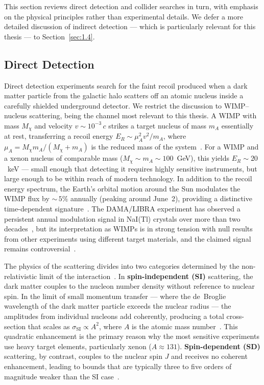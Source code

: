 This section reviews direct detection and collider searches in turn, with emphasis on the physical principles rather than experimental details.
We defer a more detailed discussion of indirect detection --- which is particularly relevant for this thesis --- to Section~\ref{sec:1.4}.

\subsection{Direct Detection}
\label{sec:1.3.1}

Direct detection experiments search for the faint recoil produced when a dark matter particle from the galactic halo scatters off an atomic nucleus inside a carefully shielded underground detector.
We restrict the discussion to WIMP--nucleus scattering, being the channel most relevant to this thesis.
A WIMP with mass $M_\chi$ and velocity $v \sim 10^{-3}\,c$ strikes a target nucleus of mass $m_A$ essentially at rest, transferring a recoil energy $E_R \sim \mu_A^2 v^2 / m_A$, where $\mu_A = M_\chi m_A / (M_\chi + m_A)$ is the reduced mass of the system~\cite{Dodelson:2020bqr}.
For a WIMP and a xenon nucleus of comparable mass ($M_\chi \sim m_A \sim 100$~GeV), this yields $E_R \sim 20$~keV --- small enough that detecting it requires highly sensitive instruments, but large enough to be within reach of modern technology.
In addition to the recoil energy spectrum, the Earth's orbital motion around the Sun modulates the WIMP flux by ${\sim}\,5\%$ annually (peaking around June~2), providing a distinctive time-dependent signature~\cite{Drukier:1986tm}.
The DAMA/LIBRA experiment has observed a persistent annual modulation signal in NaI(Tl) crystals over more than two decades~\cite{Bernabei:2018yyw}, but its interpretation as WIMPs is in strong tension with null results from other experiments using different target materials, and the claimed signal remains controversial~\cite{ANAIS-112:2025fne}.

The physics of the scattering divides into two categories determined by the non-relativistic limit of the interaction~\cite{Cirelli:2024ssz,Hooper:2024}.
In \textbf{spin-independent (SI)} scattering, the dark matter couples to the nucleon number density without reference to nuclear spin.
In the limit of small momentum transfer --- where the de~Broglie wavelength of the dark matter particle exceeds the nuclear radius --- the amplitudes from individual nucleons add coherently, producing a total cross-section that scales as $\sigma_\text{SI} \propto A^2$, where $A$ is the atomic mass number~\cite{Cirelli:2024ssz,Hooper:2024}.
This quadratic enhancement is the primary reason why the most sensitive experiments use heavy target elements, particularly xenon ($A \approx 131$).
\textbf{Spin-dependent (SD)} scattering, by contrast, couples to the nuclear spin $J$ and receives no coherent enhancement, leading to bounds that are typically three to five orders of magnitude weaker than the SI case~\cite{Cirelli:2024ssz}.

